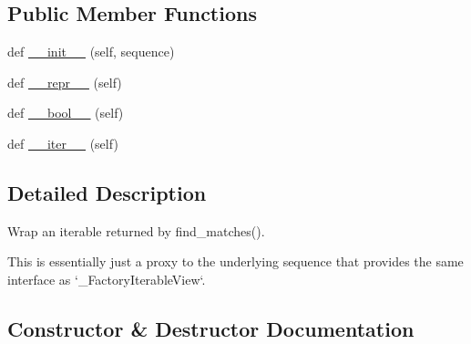 \subsection*{Public Member Functions}
\begin{DoxyCompactItemize}
\item 
def \hyperlink{classpip_1_1__vendor_1_1resolvelib_1_1structs_1_1__SequenceIterableView_ac56c91c88b274607dccba33d9619770a}{\+\_\+\+\_\+init\+\_\+\+\_\+} (self, sequence)
\item 
def \hyperlink{classpip_1_1__vendor_1_1resolvelib_1_1structs_1_1__SequenceIterableView_a7673839da4cb15b50282ac47f5fedd6a}{\+\_\+\+\_\+repr\+\_\+\+\_\+} (self)
\item 
def \hyperlink{classpip_1_1__vendor_1_1resolvelib_1_1structs_1_1__SequenceIterableView_a2a760a0bc4bbae0af2265b593db637ba}{\+\_\+\+\_\+bool\+\_\+\+\_\+} (self)
\item 
def \hyperlink{classpip_1_1__vendor_1_1resolvelib_1_1structs_1_1__SequenceIterableView_a89197b63d20d98fa3dc71b7f7ea21052}{\+\_\+\+\_\+iter\+\_\+\+\_\+} (self)
\end{DoxyCompactItemize}


\subsection{Detailed Description}
\begin{DoxyVerb}Wrap an iterable returned by find_matches().

This is essentially just a proxy to the underlying sequence that provides
the same interface as `_FactoryIterableView`.
\end{DoxyVerb}
 

\subsection{Constructor \& Destructor Documentation}
\mbox{\label{classpip_1_1__vendor_1_1resolvelib_1_1structs_1_1__SequenceIterableView_ac56c91c88b274607dccba33d9619770a}} 
